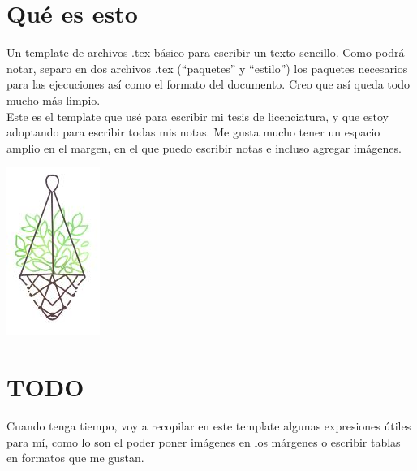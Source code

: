 \section{Qué es esto}
Un template de archivos .tex básico para escribir un texto sencillo.
Como podrá notar, separo en dos archivos .tex 
(``paquetes'' y ``estilo'')
los paquetes necesarios
para las ejecuciones así como el formato del documento.
Creo que así queda todo mucho más limpio. \\

Este es el template que usé para escribir mi tesis de licenciatura,
y que estoy adoptando para escribir todas mis notas. Me gusta mucho
tener un espacio amplio en el margen, en el que puedo escribir notas
e incluso agregar imágenes.

\begin{marginfigure}
\includegraphics[scale= 1]{plant.jpg} 
\end{marginfigure}


\section{TODO}
Cuando tenga tiempo, voy a recopilar en este template
algunas expresiones útiles para mí, como lo son el 
poder poner imágenes en los márgenes o escribir
tablas en formatos que me gustan.
